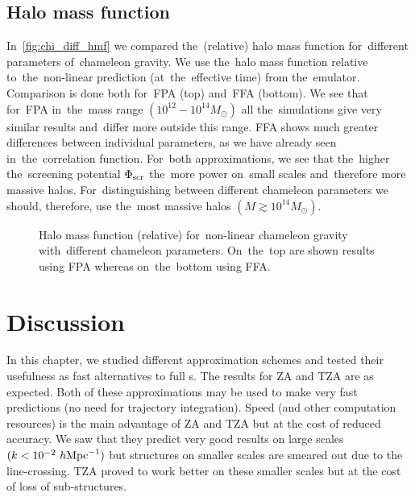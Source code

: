 \subsection{Halo mass function}
In~\autoref{fig:chi_diff_hmf} we compared the~(relative) halo mass function for~different parameters of~chameleon gravity. We use the~halo mass function relative to~the~non-linear prediction (at~the~effective time) from the~emulator. Comparison is done both for~FPA (top) and~FFA (bottom). We see that for~FPA in~the~mass range $(10^{12}-10^{14}M_\odot)$ all the~simulations give very similar results and~differ more outside this range. FFA shows much greater differences between individual parameters, as we have already seen in~the~correlation function. For~both approximations, we see that the~higher the~screening potential $\Phi_{\text{\scriptsize scr}}$ the~more power on~small scales and~therefore more massive halos. For~distinguishing between different chameleon parameters we should, therefore, use the~most massive halos $(M\gtrsim10^{14}M_\odot)$.
\begin{figure}
	\centering
	\chileft
	\begin{subfigure}{1.2\textwidth}
	\end{subfigure}
	\begin{subfigure}{1.0\textwidth}
		\centering
	\end{subfigure}
	\begin{subfigure}{1.0\textwidth}
		\centering
	\end{subfigure}
	\caption{Halo mass function (relative) for~non-linear chameleon gravity with~different chameleon parameters. On~the~top are shown results using FPA whereas on~the~bottom using FFA.}
	\label{fig:chi_diff_hmf}
\end{figure} 
\section{Discussion}
\label{sec:disc}
In this chapter, we studied different approximation schemes and tested their usefulness as fast alternatives to full \nbodysim s. The results for ZA and TZA are as expected. Both of these approximations may be used to make very fast predictions (no need for trajectory integration). Speed (and other computation resources) is the main advantage of ZA and TZA but at the cost of reduced accuracy. We saw that they predict very good results on large scales $(k<10^{-2}~h\text{Mpc}^{-1})$ but structures on smaller scales are smeared out due to the line-crossing. TZA proved to work better on these smaller scales but at the cost of loss of sub-structures.


